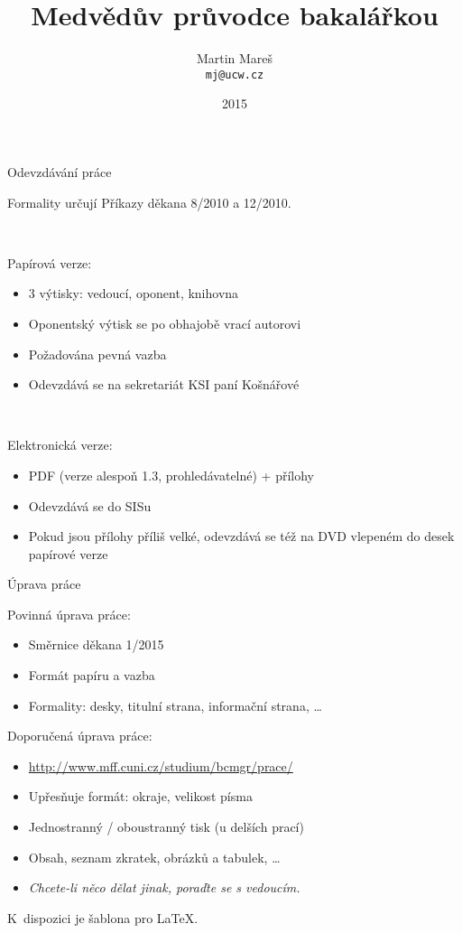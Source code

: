 \documentclass{beamer}
\title[Medvědův průvodce bakalářkou]{Medvědův průvodce bakalářkou}
\author[Martin Mareš]{Martin Mareš\\\texttt{mj@ucw.cz}}
\institute{Katedra Aplikované Matematiky\\MFF UK Praha}
\date{2015}
\begin{document}

\begin{frame}
\titlepage
\end{frame}

\begin{frame}{Odevzdávání práce}

Formality určují Příkazy děkana 8/2010 a 12/2010.

~

Papírová verze:

\begin{itemize}
\item 3 výtisky: vedoucí, oponent, knihovna
\item Oponentský výtisk se po obhajobě vrací autorovi
\item Požadována pevná vazba
\item Odevzdává se na sekretariát KSI paní Košnářové
\end{itemize}

~

Elektronická verze:

\begin{itemize}
\item PDF (verze alespoň 1.3, prohledávatelné) + přílohy
\item Odevzdává se do SISu
\item Pokud jsou přílohy příliš velké, odevzdává se též
      na DVD vlepeném do desek papírové verze
\end{itemize}

\end{frame}

\begin{frame}{Úprava práce}

Povinná úprava práce:

\begin{itemize}
\item Směrnice děkana 1/2015
\item Formát papíru a vazba
\item Formality: desky, titulní strana, informační strana, \dots
\end{itemize}

Doporučená úprava práce:

\begin{itemize}
\item \url{http://www.mff.cuni.cz/studium/bcmgr/prace/}
\item Upřesňuje formát: okraje, velikost písma
\item Jednostranný / oboustranný tisk (u delších prací)
\item Obsah, seznam zkratek, obrázků a tabulek, \dots
\item {\it Chcete-li něco dělat jinak, poraďte se s vedoucím.}
\end{itemize}

K~dispozici je šablona pro \LaTeX.

\end{frame}
\end{document}
